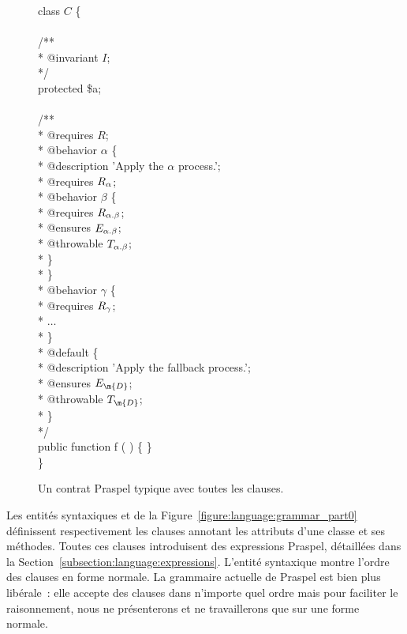 \begin{figure}
\begin{bigpre}
class \(C\) \{ \\
\\
    /** \\
     * @invariant \(I\); \\
     */ \\
    protected \$a; \\
\\
    /** \\
     * @requires \(R\); \\
     * @behavior \(\alpha\) \{ \\
     *     @description 'Apply the \(\alpha\) process.'; \\
     *     @requires \(R\sb{\alpha}\); \\
     *     @behavior \(\beta\) \{ \\
     *         @requires  \(R\sb{\alpha.\beta}\); \\
     *         @ensures   \(E\sb{\alpha.\beta}\); \\
     *         @throwable \(T\sb{\alpha.\beta}\); \\
     *     \} \\
     * \} \\
     * @behavior \(\gamma\) \{ \\
     *     @requires \(R\sb{\gamma}\); \\
     *     \(\dots\) \\
     * \} \\
     * @default \{ \\
     *     @description 'Apply the fallback process.'; \\
     *     @ensures   \(E\sb{\m{D}}\); \\
     *     @throwable \(T\sb{\m{D}}\); \\
     * \} \\
     */ \\
    public function f ( ) \{ \} \\
\}
\end{bigpre}

\caption{\label{figure:language:typical_contract} Un contrat Praspel typique
avec toutes les clauses.}

\end{figure}

Les entités syntaxiques  et  de
la Figure~\ref{figure:language:grammar_part0} définissent respectivement les
clauses annotant les attributs d'une classe et ses méthodes. Toutes ces clauses
introduisent des expressions Praspel, détaillées dans la
Section~\ref{subsection:language:expressions}. L'entité syntaxique
 montre l'ordre des clauses en forme normale. La grammaire
actuelle de Praspel est bien plus libérale~: elle accepte des clauses dans
n'importe quel ordre mais pour faciliter le raisonnement, nous ne présenterons
et ne travaillerons que sur une forme normale.

